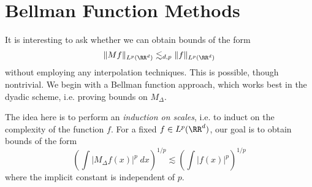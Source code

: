 \section{Bellman Function Methods}

It is interesting to ask whether we can obtain bounds of the form
%
\[ \| M f \|_{L^p(\RR^d)} \lesssim_{d,p} \| f \|_{L^p(\RR^d)} \]
%
without employing any interpolation techniques. This is possible, though nontrivial. We begin with a Bellman function approach, which works best in the dyadic scheme, i.e. proving bounds on $M_\Delta$.

The idea here is to perform an \emph{induction on scales}, i.e. to induct on the complexity of the function $f$. For a fixed $f \in L^p(\RR^d)$, our goal is to obtain bounds of the form
%
\[ \left( \int |M_\Delta f(x)|^p\; dx \right)^{1/p} \lesssim \left( \int |f(x)|^p \right)^{1/p} \]
%
where the implicit constant is independent of $p$.

